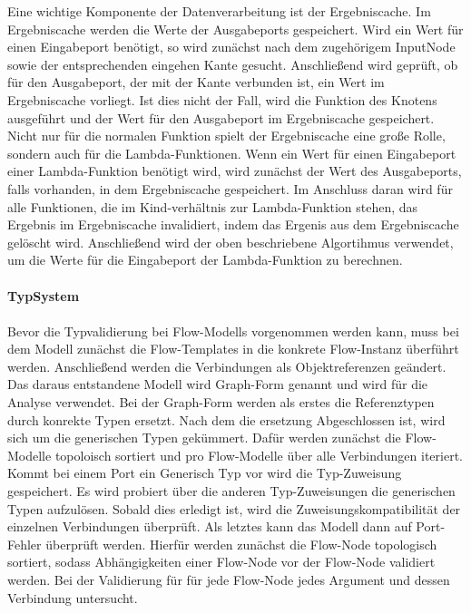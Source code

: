 \documentclass{article}
\begin{document}
    Eine wichtige Komponente der Datenverarbeitung ist der Ergebniscache. 
    Im Ergebniscache werden die Werte der Ausgabeports gespeichert.
    Wird ein Wert für einen Eingabeport benötigt, so wird zunächst nach dem zugehörigem InputNode sowie der entsprechenden eingehen Kante gesucht. 
    Anschließend wird geprüft, ob für den Ausgabeport, der mit der Kante verbunden ist, ein Wert im Ergebniscache vorliegt.
    Ist dies nicht der Fall, wird die Funktion des Knotens ausgeführt und der Wert für den Ausgabeport im Ergebniscache gespeichert.\\
    Nicht nur für die normalen Funktion spielt der Ergebniscache eine große Rolle, sondern auch für die Lambda-Funktionen.
    Wenn ein Wert für einen Eingabeport einer Lambda-Funktion benötigt wird, wird zunächst der Wert des Ausgabeports, falls vorhanden, in dem Ergebniscache gespeichert.
    Im Anschluss daran wird für alle Funktionen, die im Kind-verhältnis zur Lambda-Funktion stehen, das Ergebnis im Ergebniscache invalidiert, indem das Ergenis aus dem Ergebniscache gelöscht wird.
    Anschließend wird der oben beschriebene Algortihmus verwendet, um die Werte für die Eingabeport der Lambda-Funktion zu berechnen.\\
    \\
    \textbf{TypSystem}\\
    \\
    Bevor die Typvalidierung bei Flow-Modells vorgenommen werden kann, muss bei dem Modell zunächst die Flow-Templates in die konkrete Flow-Instanz überführt werden. 
    Anschließend werden die Verbindungen als Objektreferenzen geändert. 
    Das daraus entstandene Modell wird Graph-Form genannt und wird für die Analyse verwendet.
    Bei der Graph-Form werden als erstes die Referenztypen durch konrekte Typen ersetzt. 
    Nach dem die ersetzung Abgeschlossen ist, wird sich um die generischen Typen gekümmert. 
    Dafür werden zunächst die Flow-Modelle topoloisch sortiert und pro Flow-Modelle über alle Verbindungen iteriert. 
    Kommt bei einem Port ein Generisch Typ vor wird die Typ-Zuweisung gespeichert. 
    Es wird probiert über die anderen Typ-Zuweisungen die generischen Typen aufzulösen. 
    Sobald dies erledigt ist, wird die Zuweisungskompatibilität der einzelnen Verbindungen überprüft. 
    Als letztes kann das Modell dann auf Port-Fehler überprüft werden. Hierfür werden zunächst die Flow-Node topologisch sortiert, sodass Abhängigkeiten einer Flow-Node vor der Flow-Node validiert werden. 
    Bei der Validierung für für jede Flow-Node jedes Argument und dessen Verbindung untersucht. 
\end{document}
